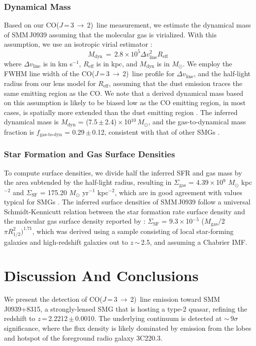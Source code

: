 \documentclass[twocolumn,apj,numberedappendix]{emulateapj}
\newcommand{\Msun}{\mbox{$M_{\odot}$}}
\newcommand{\CO}{\mbox{CO($J$\,=\,3\,$\rightarrow$\,2) }}
\newcommand{\eg}{{\sl e.g.,~}}
\newcommand{\pmOne}{\mbox{$^{-1}$}}
\begin{document}
\subsubsection{Dynamical Mass}
Based on our \CO line measurement, we estimate the dynamical mass of SMM\,J0939 assuming that the molecular gas is virialized. With this assumption, we use an isotropic virial estimator \citep[\eg][]{Engel10a}:
\begin{equation}
M_\textrm{dyn}\,=\,2.8\times 10^5\Delta v_\textrm{line}^ 2 R_\textrm{eff}
\end{equation}
where $\Delta v_\textrm{line}$ is in km\,\,s\pmOne, $R_\textrm{eff}$ is in kpc, and $M_\textrm{dyn}$ is in \Msun.
We employ the FWHM line width of the \CO line profile for $\Delta v_\textrm{line}$,
and the half-light radius from our lens model for $R_\textrm{eff}$, assuming that the dust emission traces the same emitting region as the CO. We note that a derived dynamical mass based on this assumption is likely to be biased low as the CO emitting region, in most cases, is spatially more extended than the dust emitting region \citep[\eg][]{Tacconi06a}.
% 
The inferred dynamical mass is $M_\textrm{dyn}$ = (7.5\,$\pm$\,2.4)\,$\times$\,10$^{10}$\,\Msun, and the gas-to-dynamical mass fraction is $f_\textrm{gas-to-dyn}$ = 0.29\,$\pm$\,0.12, consistent with that of other SMGs \citep{Tacconi06a}.

\subsubsection{Star Formation and Gas Surface Densities}
To compute surface densities, we divide half the inferred SFR and gas mass by the area subtended by the half-light
radius, resulting in $\Sigma_\textrm{gas}$ = 4.39\,$\times$\,10$^9$\,\,\Msun\,\,kpc$^{-2}$ and $\Sigma_\textrm{SF}$ = 175.20 \Msun\,\,yr\pmOne\,\,kpc$^{-2}$, which are in good agreement with values typical for SMGs \citep{Tacconi08a}. The inferred surface densities of SMM\,J0939 follow a universal Schmidt-Kennicutt relation between the star formation rate
surface density and the molecular gas surface density reported by \citet{B07a}: $\Sigma_\textrm{SF}$ = 9.3\,$\times$\,10$^{-5}$ ($M_\textrm{gas}$/2$\pi R_\textrm{1/2}^2)^{1.71}$, which was derived using a sample consisting of local star-forming galaxies and high-redshift
galaxies
out to $z$\,$\sim$\,2.5, and assuming a Chabrier IMF.

\section{Discussion And Conclusions}

We present the detection of \CO line emission toward SMM\,J0939+8315, a strongly-lensed SMG that is hosting a type-2 quasar, refining the redshift
to $z$\,=\,2.2212\,$\pm$\,0.0010. The underlying continuum is detected at $\sim$\,9$\sigma$ significance, where the flux density is likely dominated by emission from the lobes and hotspot of the foreground radio galaxy 3C220.3.
\end{document}
